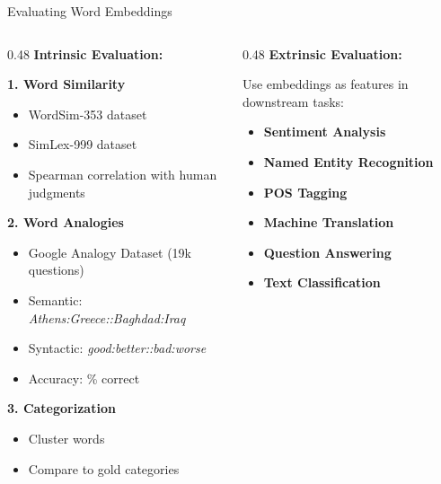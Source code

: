 \documentclass[aspectratio=169]{beamer}
\begin{document}
\begin{frame}[shrink=10]{Evaluating Word Embeddings 📏}
\begin{columns}[T]
\begin{column}{0.48\textwidth}
\textbf{Intrinsic Evaluation:}

\vspace{0.5em}
\textbf{1. Word Similarity}
\begin{itemize}\setlength{\itemsep}{0pt}
    \item WordSim-353 dataset
    \item SimLex-999 dataset
    \item Spearman correlation with human judgments
\end{itemize}

\vspace{0.5em}
\textbf{2. Word Analogies}
\begin{itemize}\setlength{\itemsep}{0pt}
    \item Google Analogy Dataset (19k questions)
    \item Semantic: \textit{Athens:Greece::Baghdad:Iraq}
    \item Syntactic: \textit{good:better::bad:worse}
    \item Accuracy: \% correct
\end{itemize}

\vspace{0.5em}
\textbf{3. Categorization}
\begin{itemize}\setlength{\itemsep}{0pt}
    \item Cluster words
    \item Compare to gold categories
\end{itemize}
\end{column}

\begin{column}{0.48\textwidth}
\textbf{Extrinsic Evaluation:}

Use embeddings as features in downstream tasks:

\vspace{0.5em}
\begin{itemize}\setlength{\itemsep}{0pt}
    \item \textbf{Sentiment Analysis}
    \item \textbf{Named Entity Recognition}
    \item \textbf{POS Tagging}
    \item \textbf{Machine Translation}
    \item \textbf{Question Answering}
    \item \textbf{Text Classification}
\end{itemize}


\end{column}
\end{columns}
\end{frame}
\end{document}
